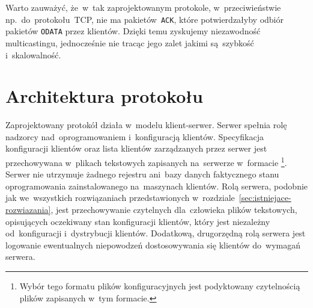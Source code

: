\documentclass[thesis]{subfiles}
\begin{document}
Warto zauważyć, że~w~tak zaprojektowanym protokole, w~przeciwieństwie np.~do~protokołu~TCP, nie ma pakietów~\texttt{ACK}, które potwierdzałyby odbiór pakietów \texttt{ODATA} przez klientów. Dzięki temu zyskujemy niezawodność multicastingu, jednocześnie nie tracąc jego zalet jakimi są~szybkość i~skalowalność.



\section{Architektura protokołu}

Zaprojektowany protokół działa w~modelu klient-serwer. Serwer spełnia rolę nadzorcy nad~oprogramowaniem i~konfiguracją klientów. Specyfikacja konfiguracji klientów oraz lista klientów zarządzanych przez serwer jest przechowywana w~plikach tekstowych zapisanych na~serwerze w~formacie \footnote{Wybór tego formatu plików konfiguracyjnych jest podyktowany czytelnością plików zapisanych w~tym formacie.}. Serwer nie utrzymuje żadnego rejestru ani~bazy danych faktycznego stanu oprogramowania zainstalowanego na~maszynach klientów. Rolą serwera, podobnie jak we~wszystkich rozwiązaniach przedstawionych w~rozdziale~\ref{sec:istniejace-rozwiazania}, jest przechowywanie czytelnych dla~człowieka plików tekstowych, opisujących oczekiwany stan konfiguracji klientów, który jest niezależny od~konfiguracji i~dystrybucji  klientów. Dodatkową, drugorzędną rolą serwera jest logowanie ewentualnych niepowodzeń dostosowywania się klientów do~wymagań serwera.
\end{document}
